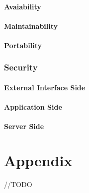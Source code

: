 \documentclass{report}
\begin{document}
			\subsubsection{Avaiability}

			\subsubsection{Maintainability}

			\subsubsection{Portability}

		\subsection{Security}

			\subsubsection{External Interface Side}

			\subsubsection{Application Side}

			\subsubsection{Server Side}


\chapter{Appendix}
//TODO
\end{document}
